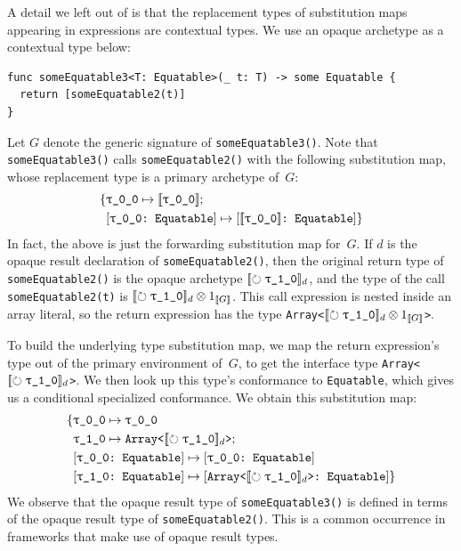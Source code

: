 \documentclass[../generics]{subfiles}
\begin{document}
\begin{example}
A detail we left out of  is that the replacement types of substitution maps appearing in expressions are contextual types. We use an opaque archetype as a contextual type below:
\begin{Verbatim}
func someEquatable3<T: Equatable>(_ t: T) -> some Equatable {
  return [someEquatable2(t)]
}
\end{Verbatim}
Let $G$ denote the generic signature of \texttt{someEquatable3()}. Note that \texttt{someEquatable3()} calls \texttt{someEquatable2()} with the following substitution map, whose replacement type is a primary archetype of~$G$:
\begin{align*}
\SubstMapC{
&\SubstType{\rT}{$\EquivClass{\rT}$}
}{\\
&\SubstConf{\rT}{$\EquivClass{\rT}$}{Equatable}
}
\end{align*}
In fact, the above is just the forwarding substitution map for~$G$. If $d$ is the opaque result declaration of \texttt{someEquatable2()}, then the original return type of \texttt{someEquatable2()} is the opaque archetype $\Oy_d$, and the type of the call \texttt{someEquatable2(t)} is $\Oy_d \otimes \FwdMap{G}$. This call expression is nested inside an array literal, so the return expression has the type \texttt{Array<$\Oy_d \otimes \FwdMap{G}$>}.

To build the underlying type substitution map, we map the return expression's type out of the primary environment of~$G$, to get the interface type \texttt{Array<$\Oy_d$>}. We then look up this type's conformance to \texttt{Equatable}, which gives us a conditional specialized conformance. We obtain this substitution map:
\begin{align*}
\SubstMapC{
&\SubstType{\rT}{\rT}\\
&\SubstType{\rO}{Array<$\Oy_d$>}
}{\\
&\SubstConf{\rT}{\rT}{Equatable}\\
&\SubstConf{\rO}{Array<$\Oy_d$>}{Equatable}
}
\end{align*}
We observe that the opaque result type of \texttt{someEquatable3()} is defined in terms of the opaque result type of \texttt{someEquatable2()}. This is a common occurrence in frameworks that make use of opaque result types.
\end{example}
\end{document}
